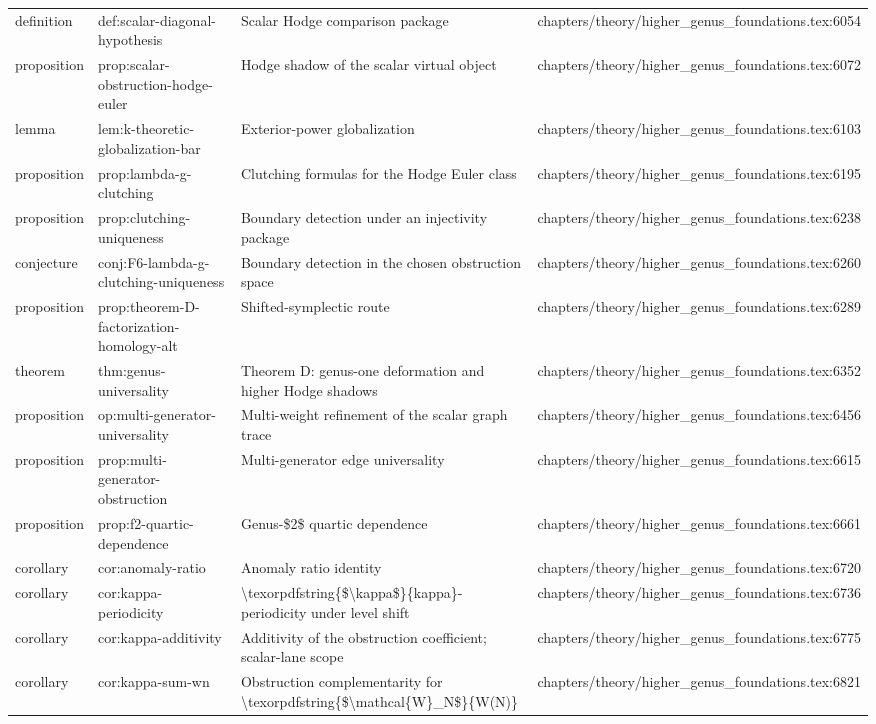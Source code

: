 \documentclass[11pt]{article}
\begin{document}
\begin{longtable}{L{0.10\textwidth}L{0.26\textwidth}L{0.42\textwidth}L{0.22\textwidth}}
definition & def:scalar-diagonal-hypothesis & Scalar Hodge comparison package & chapters/theory/higher\_genus\_foundations.tex:6054\\
proposition & prop:scalar-obstruction-hodge-euler & Hodge shadow of the scalar virtual object & chapters/theory/higher\_genus\_foundations.tex:6072\\
lemma & lem:k-theoretic-globalization-bar & Exterior-power globalization & chapters/theory/higher\_genus\_foundations.tex:6103\\
proposition & prop:lambda-g-clutching & Clutching formulas for the Hodge Euler class & chapters/theory/higher\_genus\_foundations.tex:6195\\
proposition & prop:clutching-uniqueness & Boundary detection under an injectivity package & chapters/theory/higher\_genus\_foundations.tex:6238\\
conjecture & conj:F6-lambda-g-clutching-uniqueness & Boundary detection in the chosen obstruction space & chapters/theory/higher\_genus\_foundations.tex:6260\\
proposition & prop:theorem-D-factorization-homology-alt & Shifted-symplectic route & chapters/theory/higher\_genus\_foundations.tex:6289\\
theorem & thm:genus-universality & Theorem D: genus-one deformation and higher Hodge shadows & chapters/theory/higher\_genus\_foundations.tex:6352\\
proposition & op:multi-generator-universality & Multi-weight refinement of the scalar graph trace & chapters/theory/higher\_genus\_foundations.tex:6456\\
proposition & prop:multi-generator-obstruction & Multi-generator edge universality & chapters/theory/higher\_genus\_foundations.tex:6615\\
proposition & prop:f2-quartic-dependence & Genus-\$2\$ quartic dependence & chapters/theory/higher\_genus\_foundations.tex:6661\\
corollary & cor:anomaly-ratio & Anomaly ratio identity & chapters/theory/higher\_genus\_foundations.tex:6720\\
corollary & cor:kappa-periodicity & \textbackslash{}texorpdfstring\{\$\textbackslash{}kappa\$\}\{kappa\}-periodicity under level shift & chapters/theory/higher\_genus\_foundations.tex:6736\\
corollary & cor:kappa-additivity & Additivity of the obstruction coefficient; scalar-lane scope & chapters/theory/higher\_genus\_foundations.tex:6775\\
corollary & cor:kappa-sum-wn & Obstruction complementarity for \textbackslash{}texorpdfstring\{\$\textbackslash{}mathcal\{W\}\_N\$\}\{W(N)\} & chapters/theory/higher\_genus\_foundations.tex:6821\\

\end{longtable}
\end{document}
